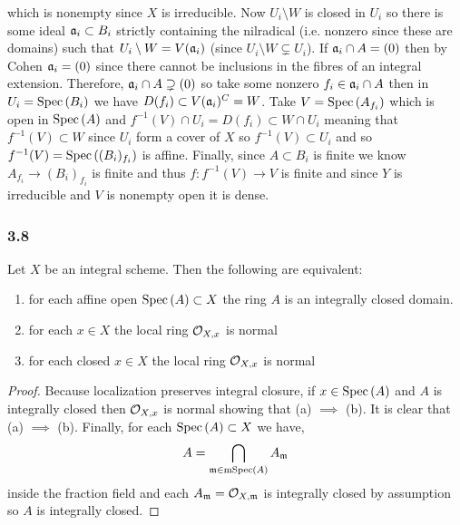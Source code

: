 \documentclass[12pt]{article}
\begin{document}
which is nonempty since $X$ is irreducible. Now $U_i \setminus W$ is closed in $U_i$ so there is some ideal $\mathfrak{a}_i \subset B_i$ strictly containing the nilradical (i.e. nonzero since these are domains) such that $U_i \setminus W = V(\mathfrak{a}_i)$ (since $U_i \setminus W \subsetneq U_i$). If $\mathfrak{a}_i \cap A = (0)$ then by Cohen $\mathfrak{a}_i = (0)$ since there cannot be inclusions in the fibres of an integral extension. Therefore, $\mathfrak{a}_i \cap A \supsetneq (0)$ so take some nonzero $f_i \in \mathfrak{a}_i \cap A$ then in $U_i = \mathrm{Spec}\left( B_i \right)$ we have $D(f_i) \subset V(\mathfrak{a}_i)^C = W$. Take $V = \mathrm{Spec}\left( A_{f_i} \right)$ which is open in $\mathrm{Spec}\left( A \right)$ and $f^{-1}(V) \cap U_i = D(f_i) \subset W \cap U_i$ meaning that $f^{-1}(V) \subset W$ since $U_i$ form a cover of $X$ so $f^{-1}(V) \subset U_i$ and so $f^{-1}(V) = \mathrm{Spec}\left( (B_i)_{f_i} \right)$ is affine. Finally, since $A \subset B_i$ is finite we know $A_{f_i} \to (B_i)_{f_i}$ is finite and thus $f : f^{-1}(V) \to V$ is finite and since $Y$ is irreducible and $V$ is nonempty open it is dense.

\subsubsection{3.8}

\begin{lemma}
Let $X$ be an integral scheme. Then the following are equivalent:
\begin{enumerate}
\item for each affine open $\mathrm{Spec}\left( A \right) \subset X$ the ring $A$ is an integrally closed domain.
\item for each $x \in X$ the local ring $\mathcal{O}_{X, x}$ is normal
\item for each closed $x \in X$ the local ring $\mathcal{O}_{X, x}$ is normal
\end{enumerate}
\end{lemma}

\begin{proof}
Because localization preserves integral closure, if $x \in \mathrm{Spec}\left( A \right)$ and $A$ is integrally closed then $\mathcal{O}_{X, x}$ is normal showing that (a) $\implies$ (b). It is clear that (a) $\implies$ (b). Finally, for each $\mathrm{Spec}\left( A \right) \subset X$ we have, 
\[ A = \bigcap_{\mathfrak{m} \in \mathrm{mSpec}\left( A \right)} A_{\mathfrak{m}} \]
inside the fraction field and each $A_{\mathfrak{m}} = \mathcal{O}_{X, \mathfrak{m}}$ is integrally closed by assumption so $A$ is integrally closed.
\end{proof}
\end{document}
